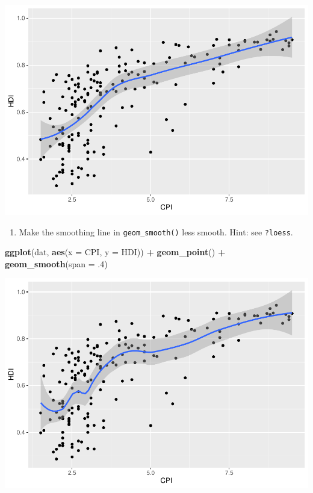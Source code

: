 \documentclass[
]{book}
\newenvironment{Shaded}{\begin{snugshade}}{\end{snugshade}}
\newcommand{\DataTypeTok}[1]{\textcolor[rgb]{0.13,0.29,0.53}{#1}}
\newcommand{\FloatTok}[1]{\textcolor[rgb]{0.00,0.00,0.81}{#1}}
\newcommand{\KeywordTok}[1]{\textcolor[rgb]{0.13,0.29,0.53}{\textbf{#1}}}
\newcommand{\NormalTok}[1]{#1}
\newcommand{\OperatorTok}[1]{\textcolor[rgb]{0.81,0.36,0.00}{\textbf{#1}}}
\newcommand{\StringTok}[1]{\textcolor[rgb]{0.31,0.60,0.02}{#1}}
\providecommand{\tightlist}{%
  \setlength{\itemsep}{0pt}\setlength{\parskip}{0pt}}
\begin{document}
\begin{alert}
\includegraphics{R/Rgraphics/figures/unnamed-chunk-190-1.pdf}

\begin{enumerate}
\def\labelenumi{\arabic{enumi}.}
\setcounter{enumi}{2}
\tightlist
\item
  Make the smoothing line in \texttt{geom\_smooth()} less smooth. Hint: see \texttt{?loess}.
\end{enumerate}

\begin{Shaded}
\begin{Highlighting}[]
\KeywordTok{ggplot}\NormalTok{(dat, }\KeywordTok{aes}\NormalTok{(}\DataTypeTok{x =}\NormalTok{ CPI, }\DataTypeTok{y =}\NormalTok{ HDI)) }\OperatorTok{+}
\StringTok{  }\KeywordTok{geom\_point}\NormalTok{() }\OperatorTok{+}
\StringTok{  }\KeywordTok{geom\_smooth}\NormalTok{(}\DataTypeTok{span =} \FloatTok{.4}\NormalTok{)}
\end{Highlighting}
\end{Shaded}

\includegraphics{R/Rgraphics/figures/unnamed-chunk-191-1.pdf}


\end{alert}
\end{document}
